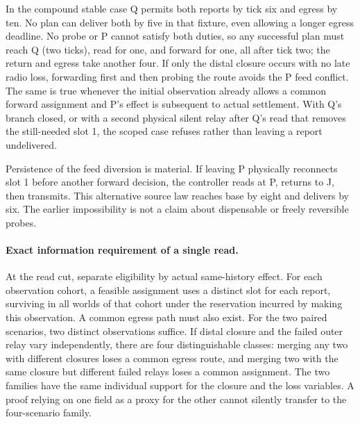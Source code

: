 \documentclass[11pt]{article}
\begin{document}
In the compound stable case Q permits both reports by tick six and
egress by ten. No plan can deliver both by five in that fixture,
even allowing a longer egress deadline. No probe or P cannot
satisfy both duties, so any successful plan must reach Q (two
ticks), read for one, and forward for one, all after tick two;
the return and egress take another four. If only the distal
closure occurs with no late radio loss, forwarding first and then
probing the route avoids the P feed conflict. The same is true
whenever the initial observation already allows a common forward
assignment and P's effect is subsequent to actual settlement.
With Q's branch closed, or with a second physical silent relay
after Q's read that removes the still-needed slot 1, the scoped
case refuses rather than leaving a report undelivered.

Persistence of the feed diversion is material. If leaving P
physically reconnects slot 1 before another forward decision,
the controller reads at P, returns to J, then transmits. This
alternative source law reaches base by eight and delivers by
six. The earlier impossibility is not a claim about dispensable
or freely reversible probes.

\paragraph{Exact information requirement of a single read.}
At the read cut, separate eligibility by actual same-history effect.
For each observation cohort, a feasible assignment uses a distinct
slot for each report, surviving in all worlds of that cohort under
the reservation incurred by making this observation. A common
egress path must also exist. For the two paired scenarios, two
distinct observations suffice. If distal closure and the failed
outer relay vary independently, there are four distinguishable
classes: merging any two with different closures loses a common
egress route, and merging two with the same closure but different
failed relays loses a common assignment. The two families have
the same individual support for the closure and the loss variables.
A proof relying on one field as a proxy for the other cannot
silently transfer to the four-scenario family.
\end{document}
